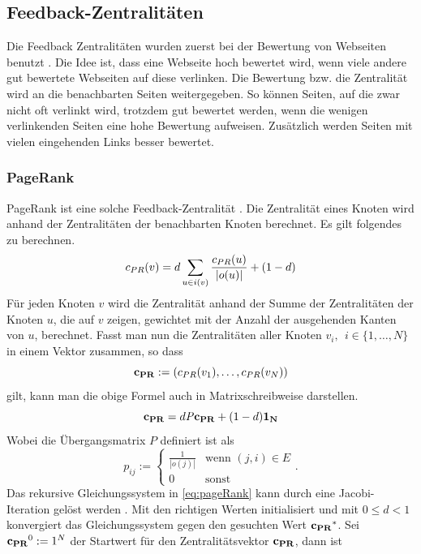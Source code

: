 \subsection{Feedback-Zentralitäten}

Die Feedback Zentralitäten wurden zuerst bei der Bewertung von Webseiten benutzt \citep{pagerank,hits}. Die Idee ist, dass eine Webseite hoch bewertet wird, wenn viele andere gut bewertete Webseiten auf diese verlinken. Die Bewertung bzw. die Zentralität wird an die benachbarten Seiten weitergegeben. So können Seiten, auf die zwar nicht oft verlinkt wird, trotzdem gut bewertet werden, wenn die wenigen verlinkenden Seiten eine hohe Bewertung aufweisen. Zusätzlich werden Seiten mit vielen eingehenden Links besser bewertet. 

\subsubsection{PageRank}
PageRank ist eine solche Feedback-Zentralität \citep{pagerank}. Die Zentralität eines Knoten wird anhand der Zentralitäten der benachbarten Knoten berechnet. Es gilt folgendes zu berechnen. 
\begin{equation}
c_{PR}(v) = d \sum_{u \in i(v)}\frac{c_{PR}(u)}{|o(u)|} + (1 - d)
\label{eq:prNonRecursiveFromula}
\end{equation}
Für jeden Knoten $v$ wird die Zentralität anhand der Summe der Zentralitäten der Knoten $u$, die auf $v$ zeigen, gewichtet mit der Anzahl der ausgehenden Kanten von $u$, berechnet. Fasst man nun die Zentralitäten aller Knoten $v_i,\ \ i \in \{1,\ldots,N\}$  in einem Vektor zusammen, so dass 
\[
\mathbf{c_{PR}} := (c_{PR}(v_1),\ldots,c_{PR}(v_N))
\] 
gilt, kann man die obige Formel auch in Matrixschreibweise darstellen. 
\begin{equation}
\mathbf{c_{PR}} = d\mathit{P}\mathbf{c_{PR}} + (1-d)\mathbf{1_N}
\label{eq:pageRank}
\end{equation}
Wobei die Übergangsmatrix $\mathit{P}$ definiert ist als 
\[
p_{ij} := \begin{cases}
\frac{1}{|o(j)|} & \text{wenn } (j,i) \in E \\
0 & \text{sonst}
\end{cases}
\text{.}
\]
Das rekursive Gleichungssystem in \ref{eq:pageRank} kann durch eine Jacobi-Iteration gelöst werden \citep{Brandes2005}. Mit den richtigen Werten initialisiert und mit $0 \leq d < 1$ konvergiert das Gleichungssystem gegen den gesuchten Wert $\mathbf{c_{PR}}^*$. Sei $\mathbf{c_{PR}}^0 := 1^N$ der Startwert für den Zentralitätsvektor $\mathbf{c_{PR}}$, dann ist 
